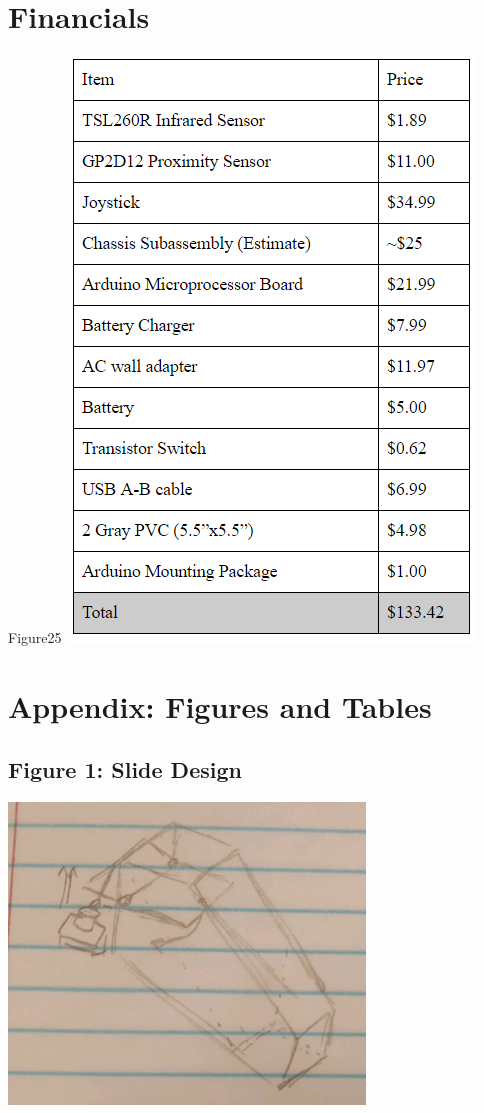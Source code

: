 \documentclass{article}
\begin{document}
\section{Financials}
 \begin{center}Figure25 {\includegraphics[]{Financials.png}}\end{center}

\newpage
\setcounter{page}{1}
\renewcommand{\thepage}{A-\arabic{page}}
\section{Appendix: Figures and Tables}

\subsection{Figure 1: Slide Design}
\begin{center}{\includegraphics[height=8cm]{Slide.png}}\end{center}
\end{document}
